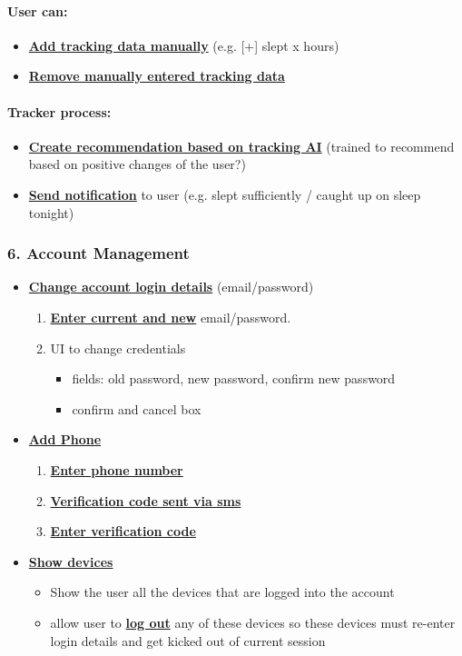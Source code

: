 \documentclass[a4paper,11pt]{article} %
\begin{document}
\paragraph{User can:}
\begin{itemize}
  \item \textbf{\ul{Add tracking data manually}} (e.g. [+] slept x hours)
  \item \textbf{\ul{Remove manually entered tracking data}}
\end{itemize}

\paragraph{Tracker process:}
\begin{itemize}
  \item \textbf{\ul{Create recommendation based on tracking AI}} (trained to recommend based on positive changes of the user?)
  \item \textbf{\ul{Send notification}} to user (e.g. slept sufficiently / caught up on sleep tonight)
\end{itemize}

\newpage
\subsubsection*{6. Account Management}
\begin{itemize}
  \item \textbf{\ul{Change account login details}} (email/password)
  \begin{enumerate}
    \item \textbf{\ul{Enter current and new}} email/password.
    \item UI to change credentials
    \begin{itemize}
      \item fields: old password, new password, confirm new password
      \item confirm and cancel box
    \end{itemize}
  \end{enumerate}
  \item \textbf{\ul{Add Phone}}
  \begin{enumerate}
    \item \textbf{\ul{Enter phone number}}
    \item \textbf{\ul{Verification code sent via sms}}
    \item \textbf{\ul{Enter verification code}}
  \end{enumerate} 
  \item \textbf{\ul{Show devices}}
  \begin{itemize}
    \item Show the user all the devices that are logged into the account
    \item allow user to \textbf{\ul{log out}} any of these devices so these devices must re-enter login details and get kicked out of current session
  \end{itemize} 
\end{itemize}
\end{document}
